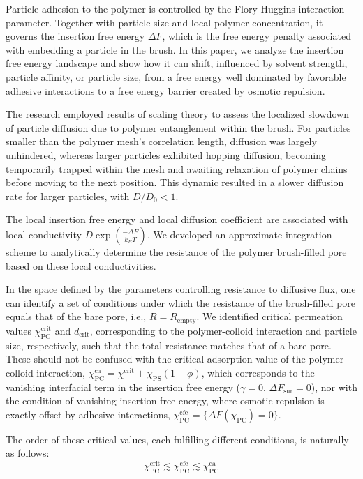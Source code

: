 \documentclass[12pt, a4paper]{article}
\begin{document}
Particle adhesion to the polymer is controlled by the Flory-Huggins interaction parameter.
Together with particle size and local polymer concentration, it governs the insertion free energy $\Delta F$, which is the free energy penalty associated with embedding a particle in the brush.
In this paper, we analyze the insertion free energy landscape and show how it can shift, influenced by solvent strength, particle affinity, or particle size, 
from a free energy well dominated by favorable adhesive interactions to a free energy barrier created by osmotic repulsion.

The research employed results of scaling theory \cite{Cai2011} to assess the localized slowdown of particle diffusion due to polymer entanglement within the brush.
For particles smaller than the polymer mesh’s correlation length, diffusion was largely unhindered, whereas larger particles exhibited hopping diffusion, becoming temporarily trapped within the mesh and awaiting relaxation of polymer chains before moving to the next position.
This dynamic resulted in a slower diffusion rate for larger particles, with $D/D_0 < 1$.

The local insertion free energy and local diffusion coefficient are associated with local conductivity $D \exp\left(\frac{-\Delta F}{k_B T}\right)$.
We developed an approximate integration scheme to analytically determine the resistance of the polymer brush-filled pore based on these local conductivities.

In the space defined by the parameters controlling resistance to diffusive flux, one can identify a set of conditions under which the resistance of the brush-filled pore equals that of the bare pore, i.e., $R = R_{\text{empty}}$.
We identified critical permeation values $\chi^{\text{crit}}_{\text{PC}}$ and $d_{\text{crit}}$, corresponding to the polymer-colloid interaction and particle size, respectively, such that the total resistance matches that of a bare pore.
These should not be confused with the critical adsorption value of the polymer-colloid interaction, $\chi^{\text{ca}}_{\text{PC}} = \chi^{\text{crit}} + \chi_{\text{PS}}(1 + \phi)$, which corresponds to the vanishing interfacial term in the insertion free energy ($\gamma = 0$, $\Delta F_{\text{sur}} = 0$), nor with the condition of vanishing insertion free energy, where osmotic repulsion is exactly offset by adhesive interactions, $\chi^{\text{cfe}}_{\text{PC}} = \{\Delta F (\chi_{\text{PC}}) = 0\}$.

The order of these critical values, each fulfilling different conditions, is naturally as follows:
\begin{equation*}
    \chi^{\text{crit}}_{\text{PC}} \lesssim \chi^{\text{cfe}}_{\text{PC}} \lesssim \chi^{\text{ca}}_{\text{PC}}
\end{equation*}
 
\end{document}
